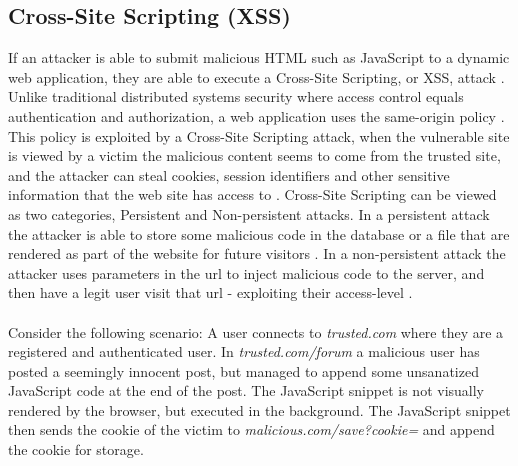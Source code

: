 \subsection{Cross-Site Scripting (XSS)}
If an attacker is able to submit malicious HTML such as JavaScript to a dynamic web application, they are able to execute a Cross-Site Scripting, or XSS, attack \cite{Kirda2011}. \\
Unlike traditional distributed systems security where access control equals authentication and authorization, a web application uses the same-origin policy \cite{Gollmann2011}. This policy is exploited by a Cross-Site Scripting attack, when the vulnerable site is viewed by a victim the malicious content seems to come from the trusted site, and the attacker can steal cookies, session identifiers and other sensitive information that the web site has access to \cite{Kirda2011}. Cross-Site Scripting can be viewed as two categories, Persistent and Non-persistent attacks. In a persistent attack the attacker is able to store some malicious code in the database or a file that are rendered as part of the website for future visitors \cite{Edmunds2016}. In a non-persistent attack the attacker uses parameters in the url to inject malicious code to the server, and then have a legit user visit that url - exploiting their access-level \cite{Edmunds2016}.
\\ \\
Consider the following scenario:
A user connects to \textit{trusted.com} where they are a registered and authenticated user. In \textit{trusted.com/forum} a malicious user has posted a seemingly innocent post, but managed to append some unsanatized JavaScript code at the end of the post. The JavaScript snippet is not visually rendered by the browser, but executed in the background. The JavaScript snippet then sends the cookie of the victim to \textit{malicious.com/save?cookie=} and append the cookie for storage.

